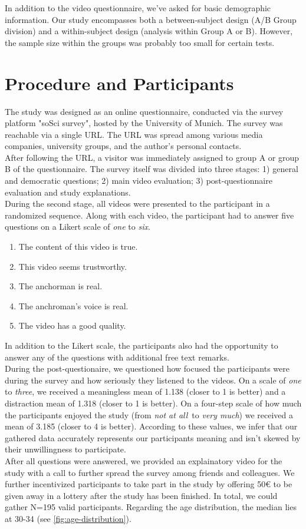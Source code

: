 \documentclass[
  a4paper,  %
  twoside,  %
  bibliography=totoc,
  headsepline,
  cleardoublepage=empty,
  parskip=half,
  draft=false
]{scrbook}
\begin{document}
In addition to the video questionnaire, we've asked for basic demographic information. Our study encompasses both a between-subject design (A/B Group division) and a within-subject design (analysis within Group A or B). However, the sample size within the groups was probably too small for certain tests.

\section{Procedure and Participants}
\label{sec:procedure-and-participants}

The study was designed as an online questionnaire, conducted via the survey platform "soSci survey", hosted by the University of Munich. The survey was reachable via a single URL. The URL was spread among various media companies, university groups, and the author’s personal contacts. \\
After following the URL, a visitor was immediately assigned to group A or group B of the questionnaire. The survey itself was divided into three stages: 1) general and democratic questions; 2) main video evaluation; 3) post-questionnaire evaluation and study explanations. \\
During the second stage, all videos were presented to the participant in a randomized sequence. Along with each video, the participant had to answer five questions on a Likert scale of \textit{one} to \textit{six}.
\begin{enumerate}
  \item The content of this video is true.
  \item This video seems trustworthy.
  \item The anchorman is real.
  \item The anchroman's voice is real.
  \item The video has a good quality.
\end{enumerate}

In addition to the Likert scale, the participants also had the opportunity to answer any of the questions with additional free text remarks. \\
During the post-questionaire, we questioned how focused the participants were during the survey and how seriously they listened to the videos. On a scale of \textit{one} to \textit{three}, we received a meaningless mean of 1.138 (closer to 1 is better) and a distraction mean of 1.318 (closer to 1 is better). On a four-step scale of how much the participants enjoyed the study (from \textit{not at all} to \textit{very much}) we received a mean of 3.185 (closer to 4 is better). According to these values, we infer that our gathered data accurately represents our participants meaning and isn't skewed by their unwillingness to participate. \\
After all questions were answered, we provided an explainatory video for the study with a call to further spread the survey among friends and colleagues. We further incentivized participants to take part in the study by offering 50€ to be given away in a lottery after the study has been finished.
In total, we could gather N=195 valid participants. Regarding the age distribution, the median lies at 30-34 (see \ref{fig:age-distribution}).
\end{document}
